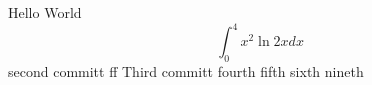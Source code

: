 \documentclass{article}
\begin{document}
Hello World
$$\int_0^4 x^2 \ln{2x}dx$$
second committ  ff
Third committ 
fourth
fifth
sixth
nineth
\end{document}
